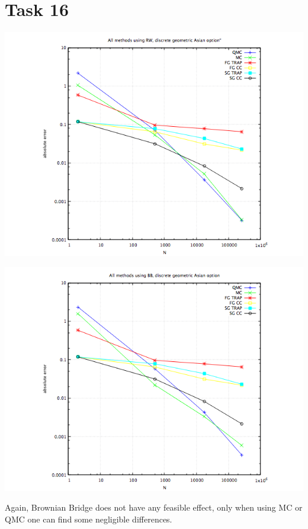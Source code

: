 \documentclass[10pt,a4paper]{article}
\begin{document}
\section*{Task 16}
\begin{center}
\includegraphics[scale=0.51]{task16rw.png}
\end{center}
\begin{center}
\includegraphics[scale=0.51]{task16bb.png}
\end{center}
Again, Brownian Bridge does not have any feasible effect, only when using MC or QMC one can find some negligible differences. 
\end{document}
